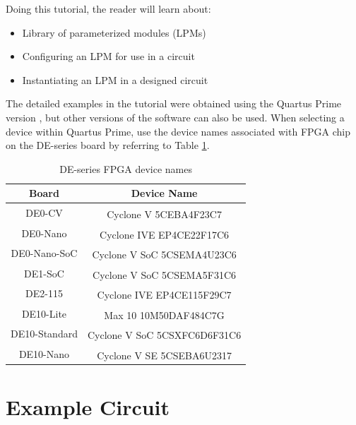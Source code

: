 \documentclass[11pt, twoside, pdftex]{article}
\begin{document}
\noindent
Doing this tutorial, the reader will learn about:
\begin{itemize}
\item Library of parameterized modules (LPMs)
\item Configuring an LPM for use in a circuit
\item Instantiating an LPM in a designed circuit
\end{itemize}

\noindent
The detailed examples in the tutorial were obtained using the Quartus Prime version \versnum, 
but other versions of the software can also be used. When selecting a device within Quartus Prime, use the device names associated with FPGA chip on the DE-series board by referring to Table \ref{tab:device}. 

\begin{table}[H]
	\begin{center}
	\begin{tabular}{| c | c |}
	\hline
	Board & Device Name \\
	\hline
	DE0-CV & Cyclone\textsuperscript{\textregistered} V 5CEBA4F23C7 \\
	\hline
	DE0-Nano & Cyclone\textsuperscript{\textregistered} IVE EP4CE22F17C6 \\
	\hline
	DE0-Nano-SoC & Cyclone\textsuperscript{\textregistered} V SoC 5CSEMA4U23C6\\
	\hline
	DE1-SoC & Cyclone\textsuperscript{\textregistered} V SoC 5CSEMA5F31C6 \\
	\hline
	DE2-115 & Cyclone\textsuperscript{\textregistered} IVE EP4CE115F29C7 \\
	\hline
	DE10-Lite & Max\textsuperscript{\textregistered} 10 10M50DAF484C7G \\
	\hline
	DE10-Standard & Cyclone\textsuperscript{\textregistered} V SoC 5CSXFC6D6F31C6 \\
	\hline
	DE10-Nano & Cyclone\textsuperscript{\textregistered} V SE 5CSEBA6U2317 \\
	\hline
	\end{tabular}
	\caption{DE-series FPGA device names}
	\label{tab:device}
	\end{center}
\end{table}

\section{Example Circuit}
\end{document}
